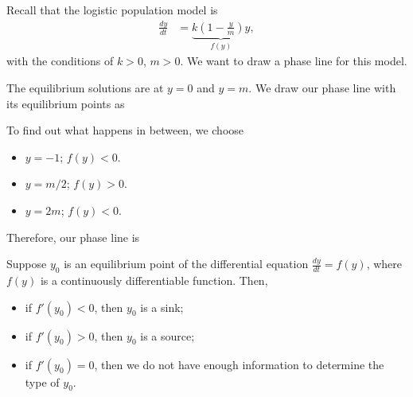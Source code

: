 \documentclass[10pt]{mypackage}
\begin{document}
\begin{example}
Recall that the logistic population model is
\begin{align*}
  \frac{dy}{dt} &= \underbrace{k\left(1-\frac{y}{m}\right)y}_{f(y)},
\end{align*}
with the conditions of $k > 0$, $m > 0$. We want to draw a phase line for this model.\newline

The equilibrium solutions are at $y=0$ and $y = m$. We draw our phase line with its equilibrium points as
\begin{center}
\end{center}
To find out what happens in between, we choose
\begin{itemize}
  \item $y = -1$; $f(y) < 0$.
  \item $y = m/2$; $f(y) > 0$.
  \item $y = 2m$; $f(y) < 0$.
\end{itemize}
Therefore, our phase line is
\begin{center}
\end{center}
\end{example}
\begin{theorem}[Linearization]
  Suppose $y_0$ is an equilibrium point of the differential equation $\frac{dy}{dt} = f(y)$, where $f(y)$ is a continuously differentiable function. Then,
  \begin{itemize}
    \item if $f'\left(y_0\right) < 0$, then $y_0$ is a sink;
    \item if $f'\left(y_0\right) > 0$, then $y_0$ is a source;
    \item if $f'\left(y_0\right) = 0$, then we do not have enough information to determine the type of $y_0$.
  \end{itemize}
\end{theorem}
\end{document}
